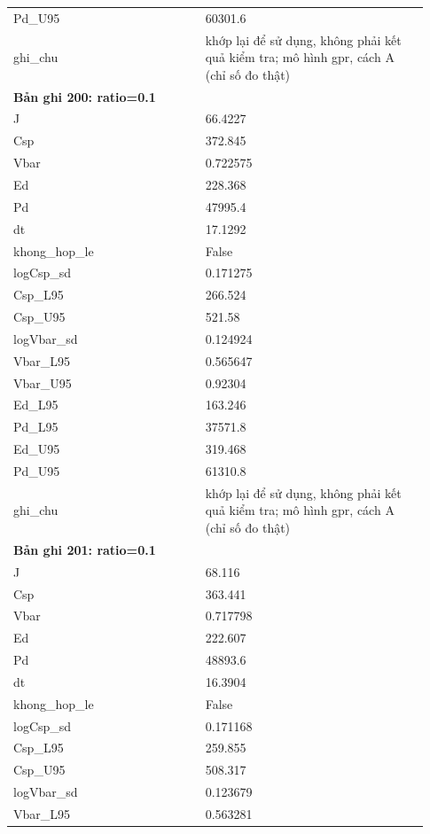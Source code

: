 \begin{longtable}{p{0.43\linewidth}p{0.50\linewidth}}
Pd\_\allowbreak U95 & 60301.6 \\
ghi\_\allowbreak chu & khớp lại để sử dụng, không phải kết quả kiểm tra; mô hình gpr, cách A (chỉ số đo thật) \\
\midrule
\multicolumn{2}{p{0.95\linewidth}}{\textbf{Bản ghi 200: ratio=0.1}} \\
J & 66.4227 \\
Csp & 372.845 \\
Vbar & 0.722575 \\
Ed & 228.368 \\
Pd & 47995.4 \\
dt & 17.1292 \\
khong\_\allowbreak hop\_\allowbreak le & False \\
logCsp\_\allowbreak sd & 0.171275 \\
Csp\_\allowbreak L95 & 266.524 \\
Csp\_\allowbreak U95 & 521.58 \\
logVbar\_\allowbreak sd & 0.124924 \\
Vbar\_\allowbreak L95 & 0.565647 \\
Vbar\_\allowbreak U95 & 0.92304 \\
Ed\_\allowbreak L95 & 163.246 \\
Pd\_\allowbreak L95 & 37571.8 \\
Ed\_\allowbreak U95 & 319.468 \\
Pd\_\allowbreak U95 & 61310.8 \\
ghi\_\allowbreak chu & khớp lại để sử dụng, không phải kết quả kiểm tra; mô hình gpr, cách A (chỉ số đo thật) \\
\midrule
\multicolumn{2}{p{0.95\linewidth}}{\textbf{Bản ghi 201: ratio=0.1}} \\
J & 68.116 \\
Csp & 363.441 \\
Vbar & 0.717798 \\
Ed & 222.607 \\
Pd & 48893.6 \\
dt & 16.3904 \\
khong\_\allowbreak hop\_\allowbreak le & False \\
logCsp\_\allowbreak sd & 0.171168 \\
Csp\_\allowbreak L95 & 259.855 \\
Csp\_\allowbreak U95 & 508.317 \\
logVbar\_\allowbreak sd & 0.123679 \\
Vbar\_\allowbreak L95 & 0.563281 \\

\end{longtable}
